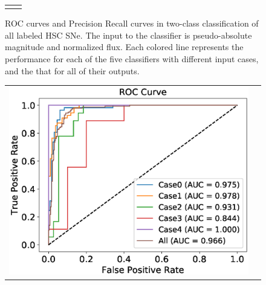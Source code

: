 \documentclass[proof]{pasj01}
\begin{document}
\begin{figure}[htbp]
\begin{tabular}{cc}
\begin{minipage}{0.5\hsize}
\begin{center}
            \end{center}
        \end{minipage}
    \end{tabular}
    \vspace{2mm}
    \caption{%
    ROC curves and Precision Recall curves in two-class classification of all labeled HSC SNe.
    The input to the classifier is pseudo-absolute magnitude and normalized flux.
    Each colored line represents the performance for each of the five classifiers with different input cases, and the that for all of their outputs.
    }
    \label{fig:h2_test_all}
\end{figure}
%
%
%
\begin{figure}[htbp]
    \begin{tabular}{cc}
        \begin{minipage}{0.5\hsize}
            \begin{center}
                \includegraphics[width=\columnwidth]{figures/10_absolute-magnitude-scaled-flux-remove-y_SNdata_test_190522_ROC_noedge_spec.eps}
            \end{center}
        \end{minipage}
        \begin{minipage}{0.5\hsize}
            \begin{center}

\end{center}
\end{minipage}
\end{tabular}
\end{figure}
\end{document}
